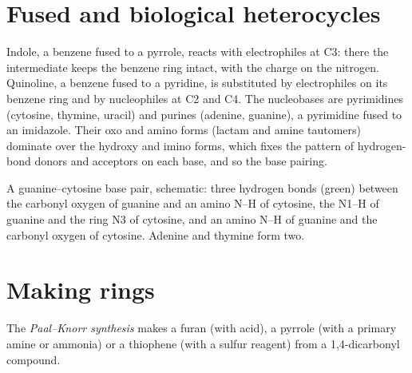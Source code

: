 \section{Fused and biological heterocycles}

Indole, a benzene fused to a pyrrole, reacts with electrophiles at C3: there the
intermediate keeps the benzene ring intact, with the charge on the nitrogen.
Quinoline, a benzene fused to a pyridine, is substituted by electrophiles on
its benzene ring and by nucleophiles at C2 and C4. The nucleobases are
pyrimidines (cytosine, thymine, uracil) and purines (adenine, guanine), a
pyrimidine fused to an imidazole. Their oxo and amino forms (lactam and amine
tautomers) dominate over the hydroxy and imino forms, which fixes the pattern of
hydrogen-bond donors and acceptors on each base, and so the base pairing.

\begin{omfigure}

{\small A guanine--cytosine base pair, schematic: three hydrogen bonds (green)
between the carbonyl oxygen of guanine and an amino N--H of cytosine, the N1--H of
guanine and the ring N3 of cytosine, and an amino N--H of guanine and the
carbonyl oxygen of cytosine. Adenine and thymine form two.}
\end{omfigure}

\section{Making rings}

\begin{definition}\label{def:b3:heterocycles:paal-knorr}
The \emph{Paal--Knorr synthesis} makes a furan
(with acid), a pyrrole (with a primary amine or ammonia) or a thiophene (with a
sulfur reagent) from a 1,4-dicarbonyl compound.
\end{definition}

